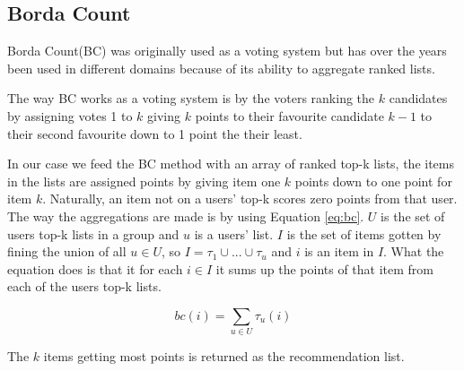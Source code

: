 \subsection{Borda Count}\label{sec:bordacount}
Borda Count(BC) was originally used as a voting system but has over the years been used in different domains because of its ability to aggregate ranked lists.

The way BC works as a voting system is by the voters ranking the $k$ candidates by assigning votes 1 to $k$ giving $k$ points to their favourite candidate $k-1$ to their second favourite down to 1 point the their least.

In our case we feed the BC method with an array of ranked top-k lists, the items in the lists are assigned points by giving item one $k$ points down to one point for item $k$\cite{ourreport}.  Naturally, an item not on a users' top-k scores zero points from that user. The way the aggregations are made is by using Equation \ref{eq:bc}. $U$ is the set of users top-k lists in a group and $u$ is a users' list. $I$ is the set of items gotten by fining the union of all $u\in U$, so $I = \tau_1 \cup ... \cup \tau_u$ and $i$ is an item in $I$. What the equation does is that it for each $i\in I$ it sums up the points of that item from each of the users top-k lists.


\begin{equation}\label{eq:bc}
bc(i) = \sum_{u\in U} \tau_u(i)
\end{equation}

The $k$ items getting most points is returned as the recommendation list.